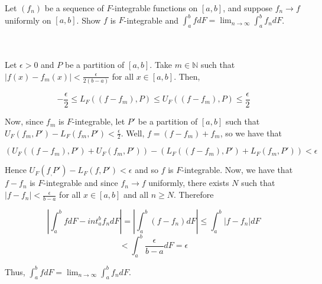 Let $(f_n)$ be a sequence of $F$-integrable functions on $[a,b]$, and suppose $f_n\rightarrow f$
uniformly on $[a,b]$. Show $f$ is $F$-integrable and
$\int_a^bfdF=\lim_{n\rightarrow\infty}\int_a^bf_ndF$.\\\\

\begin{solution}\renewcommand{\qedsymbol}{}\ \\
    Let $\epsilon>0$ and $P$ be a partition of $[a,b]$. Take $m\in\mathbb{N}$ such that
    $|f(x)-f_m(x)|<\frac{\epsilon}{2(b-a)}$ for all $x\in[a,b]$. Then,
    
    $$-\frac{\epsilon}{2}\leq L_F((f-f_m),P)\leq U_F((f-f_m),P)\leq\frac{\epsilon}{2}$$
    
    Now, since $f_m$ is $F$-integrable, let $P'$ be a partition of $[a,b]$ such that
    $U_F(f_m,P')-L_F(f_m,P')<\frac{\epsilon}{2}$. Well, $f=(f-f_m)+f_m$, so we have that
    
    $$(U_F((f-f_m),P')+U_F(f_m,P'))-(L_F((f-f_m),P')+L_F(f_m,P'))<\epsilon$$
    
    Hence $U_F(f_,P')-L_F(f,P')<\epsilon$ and so $f$ is $F$-integrable. Now, we have that $f-f_n$ is
    $F$-integrable and since $f_n\rightarrow f$ uniformly, there exists $N$ such that
    $|f-f_n|<\frac{\epsilon}{b-a}$ for all $x\in[a,b]$ and all $n\geq N$. Therefore
    
    $$|\int_a^bfdF-int_a^bf_ndF|=|\int_a^b(f-f_n)dF|\leq\int_a^b|f-f_n|dF$$
    $$<\int_a^b\frac{\epsilon}{b-a}dF=\epsilon$$
    
    Thus, $\int_a^bfdF=\lim_{n\rightarrow\infty}\int_a^bf_ndF$.

\end{solution}